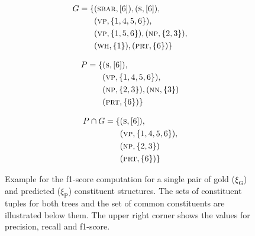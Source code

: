 \documentclass[../document.tex]{subfiles}
\begin{document}
\begin{figure}
        \begin{minipage}{.35\linewidth}
            \small
            \begin{align*}
                G = \{
                    &(\textsc{sbar}, [6]),
                     (\textsc{s}, [6]), \\
                    &(\textsc{vp}, \{1,4,5,6\}),\\
                    &(\textsc{vp}, \{1,5,6\}),
                     (\textsc{np}, \{2,3\}), \\
                    &(\textsc{wh}, \{1\}),
                     (\textsc{prt}, \{6\}) \}
             \end{align*}
         \end{minipage}
        \hfill
         \begin{minipage}{.3\linewidth}
             \small
             \begin{align*}
                P = \{
                    &(\textsc{s}, [6]), \\
                    &(\textsc{vp}, \{1,4,5,6\}),\\
                    &(\textsc{np}, \{2,3\}),
                     (\textsc{nn}, \{3\}) \\
                    &(\textsc{prt}, \{6\}) \}
            \end{align*}
        \end{minipage}
        \hfill
        \begin{minipage}{.3\linewidth}
            \small
            \begin{align*}
                P \cap G = \{
                &(\textsc{s}, [6]), \\
                &(\textsc{vp}, \{1,4,5,6\}),\\
                &(\textsc{np}, \{2,3\}) \\
                &(\textsc{prt}, \{6\}) \}
            \end{align*}
        \end{minipage}

        \caption{
            Example for the f1-score computation for a single pair of gold (\(\xi_\text{G}\)) and predicted (\(\xi_\text{P}\)) constituent structures.
            The sets of constituent tuples for both trees and the set of common constituents are illustrated below them.
            The upper right corner shows the values for precision, recall and f1-score.
        }
    \end{figure}
\end{document}
